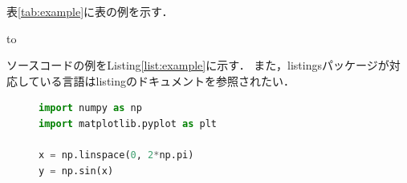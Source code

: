 表\ref{tab:example}に表の例を示す．

\begin{table}[tb]
    \caption{表の例}
    \label{tab:example}
    \hbox to
\end{table}

ソースコードの例をListing\ref{list:example}に示す．
また，listingsパッケージが対応している言語はlistingのドキュメント\cite{listings}を参照されたい．

\begin{figure}[tb]
    \begin{lstlisting}[language=Python, caption={ソースコードの例}, label={list:example}]
import numpy as np
import matplotlib.pyplot as plt

x = np.linspace(0, 2*np.pi)
y = np.sin(x)
\end{lstlisting}
\end{figure}



